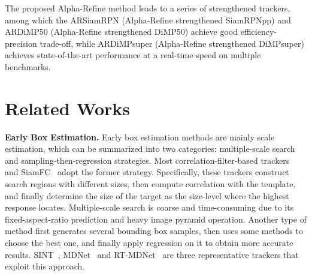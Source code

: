 \documentclass[final]{cvpr}
\begin{document}
The proposed Alpha-Refine method leads to a series of strengthened trackers, among which the ARSiamRPN (Alpha-Refine strengthened SiamRPNpp) and ARDiMP50 (Alpha-Refine strengthened DiMP50) achieve good efficiency-precision trade-off, while ARDiMPsuper (Alpha-Refine strengthened DiMPsuper) achieves state-of-the-art performance at a real-time speed on multiple benchmarks.

\section{Related Works}
{\noindent \textbf{Early Box Estimation.}} Early box estimation methods are mainly scale estimation, 
which can be summarized into two categories:
multiple-scale search and sampling-then-regression strategies. 
Most correlation-filter-based trackers ~\cite{KCF,ECO,DRT} and SiamFC~\cite{SiameseFC} adopt the former strategy. 
Specifically, these trackers construct search regions with different sizes, then compute correlation with the template,
and finally determine the size of the target as the size-level where the highest response locates. 
Multiple-scale search is coarse and time-consuming due to its fixed-aspect-ratio prediction and heavy image pyramid 
operation. 
Another type of method first generates several bounding box samples, then uses some methods to choose 
the best one, and finally apply regression on it to obtain more accurate results. 
SINT~\cite{SINT}, MDNet~\cite{MDNet} and RT-MDNet~\cite{RTMDNet} are three representative trackers 
that exploit this approach. 
\end{document}
